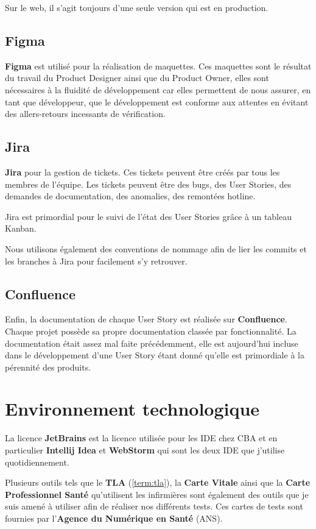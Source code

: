 \documentclass{article}
\begin{document}
Sur le web, il s'agit toujours d'une seule version qui est en production.

\subsection{Figma}

\textbf{Figma} est utilisé pour la réalisation de maquettes. Ces maquettes sont le résultat du travail du Product Designer ainsi que du Product Owner, elles sont nécessaires à la fluidité de développement car elles permettent de nous assurer, en tant que développeur, que le développement est conforme aux attentes en évitant des allers-retours incessants de vérification.

\subsection{Jira}
\textbf{Jira} pour la gestion de tickets. Ces tickets peuvent être créés par tous les membres de l'équipe. Les tickets peuvent être des bugs, des User Stories, des demandes de documentation, des anomalies, des remontées hotline.

Jira est primordial pour le suivi de l'état des User Stories grâce à un tableau Kanban.

Nous utilisons également des conventions de nommage afin de lier les commits et les branches à Jira pour facilement s'y retrouver.

\subsection{Confluence}
Enfin, la documentation de chaque User Story est réalisée sur \textbf{Confluence}.
Chaque projet possède sa propre documentation classée par fonctionnalité. La documentation était assez mal faite précédemment, elle est aujourd'hui incluse dans le développement d'une User Story étant donné qu'elle est primordiale à la pérennité des produits.

\newpage

\section{Environnement technologique}

La licence \textbf{JetBrains} est la licence utilisée pour les IDE chez CBA et en particulier \textbf{Intellij Idea} et \textbf{WebStorm} qui sont les deux IDE que j'utilise quotidiennement.

Plusieurs outils tels que le \textbf{TLA} (\ref{term:tla}), la \textbf{Carte Vitale} ainsi que la \textbf{Carte Professionnel Santé} qu'utilisent les infirmières sont également des outils que je suis amené à utiliser afin de réaliser nos différents tests. Ces cartes de tests sont fournies par l'\textbf{Agence du Numérique en Santé} (ANS).
\end{document}
